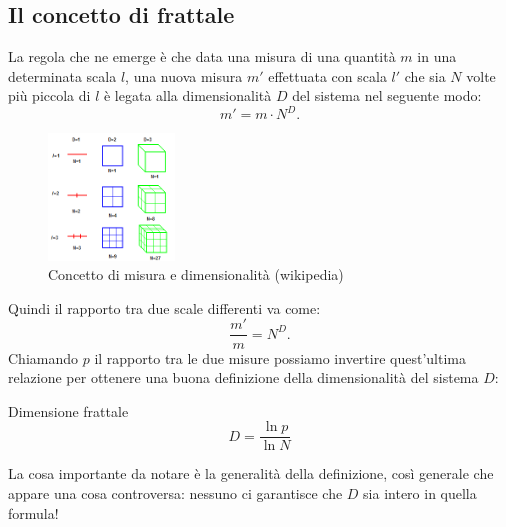 \subsection{Il concetto di frattale}%
\label{sub:Il concetto di frattale}
La regola che ne emerge è che data una misura di una quantità $m$ in una determinata scala $l$, una nuova misura $m'$ effettuata con scala $l'$ che sia $N$ volte più piccola di $l$ è legata alla dimensionalità $D$ del sistema nel seguente modo:
\[
    m' = m\cdot N^D 
.\] 
\begin{figure}[H]
    \centering
    \includegraphics[width=0.3\textwidth]{figures/fractal_wiki.png}
    \caption{\scriptsize Concetto di misura e dimensionalità (wikipedia)}
    \label{fig:figures-fractal_wiki-png}
\end{figure}
\noindent
Quindi il rapporto tra due scale differenti va come:
\[
    \frac{m'}{m} = N^D
.\] 
Chiamando $p$ il rapporto tra le due misure possiamo invertire quest'ultima relazione per ottenere una buona definizione della dimensionalità del sistema $D$:
\begin{redbox}{Dimensione frattale}
\begin{equation}
    D = \frac{\ln p}{\ln N}
    \label{eq:22_dim_fratt}
\end{equation}
\end{redbox}
\noindent
La cosa importante da notare è la generalità della definizione, così generale che appare una cosa controversa: nessuno ci garantisce che $D$ sia intero in quella formula!
